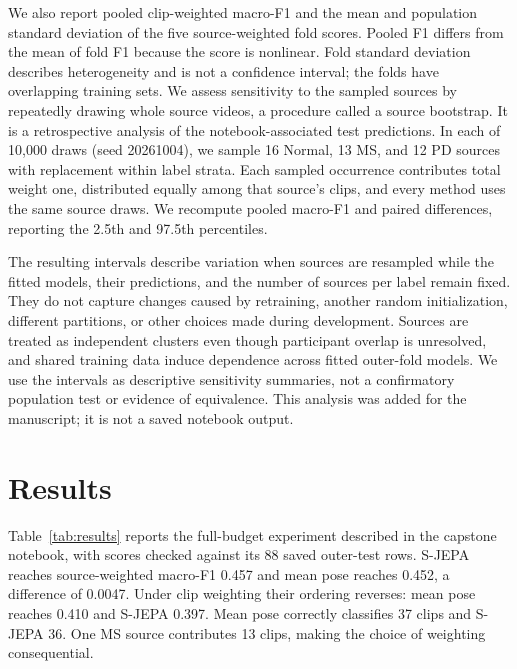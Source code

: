 \documentclass[10pt,twocolumn,letterpaper]{article}
\begin{document}
We also report pooled clip-weighted macro-F1 and the mean and population standard deviation of the five source-weighted fold scores. Pooled F1 differs from the mean of fold F1 because the score is nonlinear. Fold standard deviation describes heterogeneity and is not a confidence interval; the folds have overlapping training sets. We assess sensitivity to the sampled sources by repeatedly drawing whole source videos, a procedure called a source bootstrap. It is a retrospective analysis of the notebook-associated test predictions. In each of 10,000 draws (seed 20261004), we sample 16 Normal, 13 MS, and 12 PD sources with replacement within label strata. Each sampled occurrence contributes total weight one, distributed equally among that source's clips, and every method uses the same source draws. We recompute pooled macro-F1 and paired differences, reporting the 2.5th and 97.5th percentiles.

The resulting intervals describe variation when sources are resampled while the fitted models, their predictions, and the number of sources per label remain fixed. They do not capture changes caused by retraining, another random initialization, different partitions, or other choices made during development. Sources are treated as independent clusters even though participant overlap is unresolved, and shared training data induce dependence across fitted outer-fold models. We use the intervals as descriptive sensitivity summaries, not a confirmatory population test or evidence of equivalence. This analysis was added for the manuscript; it is not a saved notebook output.

\section{Results}
Table~\ref{tab:results} reports the full-budget experiment described in the capstone notebook, with scores checked against its 88 saved outer-test rows. S-JEPA reaches source-weighted macro-F1 0.457 and mean pose reaches 0.452, a difference of 0.0047. Under clip weighting their ordering reverses: mean pose reaches 0.410 and S-JEPA 0.397. Mean pose correctly classifies 37 clips and S-JEPA 36. One MS source contributes 13 clips, making the choice of weighting consequential.
\end{document}
